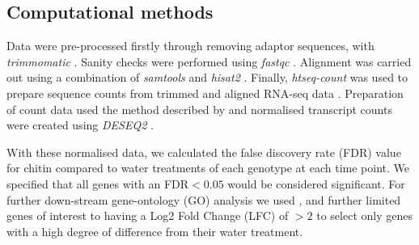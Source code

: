 \documentclass[../main.tex]{subfiles}
\begin{document}
\subsection{Computational methods}

Data were pre-processed firstly through removing adaptor sequences, with
\textit{trimmomatic} \cite{bolgerTrimmomaticFlexibleTrimmer2014}. Sanity checks
were performed using \textit{fastqc} \cite{andrewsBabrahamBioinformaticsFastQC}.
Alignment was carried out using a combination of \textit{samtools} and
\textit{hisat2} \cite{liSequenceAlignmentMap2009}. Finally, \textit{htseq-count}
was used to prepare sequence counts from trimmed and aligned RNA-seq data
\cite{kimHISATFastSpliced2015}. Preparation of count data used the method
described by \citet{loveModeratedEstimationFold2014} and normalised transcript
counts were created using \textit{DESEQ2}
\cite{piperCountNormalizationDESeq22017}.

With these normalised data, we calculated the false discovery rate (FDR) value
for chitin compared to water treatments of each genotype at each time point. We
specified that all genes with an FDR$< 0.05$ would be considered significant.
For further down-stream gene-ontology (GO) analysis we used
\cite{klopfensteinGOATOOLSPythonLibrary2018}, and further limited genes of
interest to having a Log2 Fold Change (LFC) of $>2$ to select only genes with a
high degree of difference from their water treatment.
\end{document}
